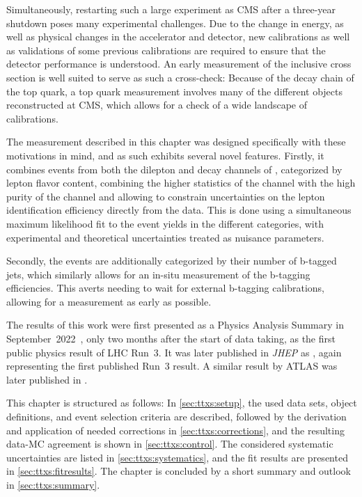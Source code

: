 Simultaneously, restarting such a large experiment as CMS after a three-year shutdown poses many experimental challenges. Due to the change in energy, as well as physical changes in the accelerator and detector, new calibrations as well as validations of some previous calibrations are required to ensure that the detector performance is understood. An early measurement of the inclusive \ttbar cross section is well suited to serve as such a cross-check: Because of the decay chain of the top quark, a top quark measurement involves many of the different objects reconstructed at CMS, which
allows for a check of a wide landscape of calibrations.

The measurement described in this chapter was designed specifically with these motivations in mind, and as such exhibits several novel features. Firstly, it combines events from both the dilepton and \ljets decay channels of \ttbar, categorized by lepton flavor content, combining the higher statistics of the \ljets channel with the high purity of the \emu channel and allowing to constrain uncertainties on the lepton identification efficiency directly from the data. This is done using a simultaneous maximum likelihood fit to the event yields in the different categories, with experimental and theoretical uncertainties treated as nuisance parameters.

Secondly, the events are additionally categorized by their number of b-tagged jets, which similarly allows for an in-situ measurement of the b-tagging efficiencies. This averts needing to wait for external b-tagging calibrations, allowing for a measurement as early as possible.

The results of this work were first presented as a Physics Analysis Summary in September~2022~\cite{CMS:TOP-22-012-PAS}, only two months after the start of data taking, as the first public physics result of LHC Run~3. It was later published in \textit{JHEP} as , again representing the first published Run~3 result. A similar result by ATLAS was later published in .

This chapter is structured as follows: In \cref{sec:ttxs:setup}, the used data sets, object definitions, and event selection criteria are described, followed by the derivation and application of needed corrections in \cref{sec:ttxs:corrections}, and the resulting data-MC agreement is shown in \cref{sec:ttxs:control}. The considered systematic uncertainties are listed in \cref{sec:ttxs:systematics}, and the fit results are presented in \cref{sec:ttxs:fitresults}. The chapter is concluded by a short summary and outlook in \cref{sec:ttxs:summary}.

